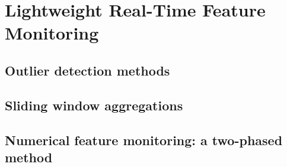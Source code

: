 \chapter{Lightweight Real-Time Feature Monitoring} \label{chap:my-work} \minitoc


\section*{Outlier detection methods}

\section*{Sliding window aggregations}

\section{Numerical feature monitoring: a two-phased method}


